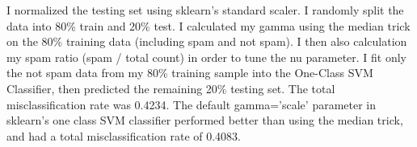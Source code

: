 \documentclass[twoside,10pt]{article}
\begin{document}
\begin{enumerate}
\begin{enumerate}
I normalized the testing set using sklearn's standard scaler.  I randomly split the data into 80\% train and 20\% test.  I calculated my gamma using the median trick on the 80\% training data (including spam and not spam).  I then also calculation my spam ratio (spam / total count) in order to tune the nu parameter. I fit only the not spam data from my 80\% training sample into the One-Class SVM Classifier, then predicted the remaining 20\% testing set.  The total misclassification rate was 0.4234.  The default gamma='scale' parameter in sklearn's one class SVM classifier performed better than using the median trick, and had a total misclassification rate of 0.4083.

\end{enumerate}


\end{enumerate}
\end{document}

